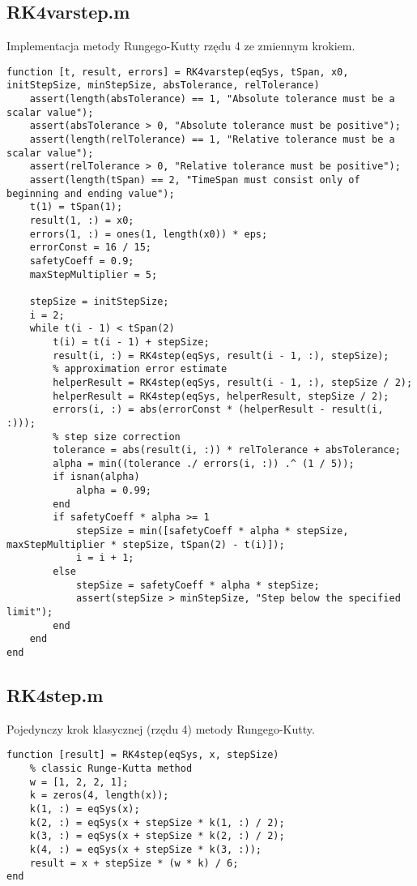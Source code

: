\documentclass[12pt]{article}
\begin{document}
\subsection{RK4varstep.m}
Implementacja metody Rungego-Kutty rzędu 4 ze zmiennym krokiem.
\begin{verbatim}
function [t, result, errors] = RK4varstep(eqSys, tSpan, x0, initStepSize, minStepSize, absTolerance, relTolerance)
    assert(length(absTolerance) == 1, "Absolute tolerance must be a scalar value");
    assert(absTolerance > 0, "Absolute tolerance must be positive");
    assert(length(relTolerance) == 1, "Relative tolerance must be a scalar value");
    assert(relTolerance > 0, "Relative tolerance must be positive");
    assert(length(tSpan) == 2, "TimeSpan must consist only of beginning and ending value");
    t(1) = tSpan(1);
    result(1, :) = x0;
    errors(1, :) = ones(1, length(x0)) * eps;
    errorConst = 16 / 15;
    safetyCoeff = 0.9;
    maxStepMultiplier = 5;

    stepSize = initStepSize;
    i = 2;
    while t(i - 1) < tSpan(2)
        t(i) = t(i - 1) + stepSize;
        result(i, :) = RK4step(eqSys, result(i - 1, :), stepSize);
        % approximation error estimate
        helperResult = RK4step(eqSys, result(i - 1, :), stepSize / 2);
        helperResult = RK4step(eqSys, helperResult, stepSize / 2);
        errors(i, :) = abs(errorConst * (helperResult - result(i, :)));
        % step size correction
        tolerance = abs(result(i, :)) * relTolerance + absTolerance;
        alpha = min((tolerance ./ errors(i, :)) .^ (1 / 5));
        if isnan(alpha)
            alpha = 0.99;
        end
        if safetyCoeff * alpha >= 1
            stepSize = min([safetyCoeff * alpha * stepSize, maxStepMultiplier * stepSize, tSpan(2) - t(i)]);
            i = i + 1;
        else
            stepSize = safetyCoeff * alpha * stepSize;
            assert(stepSize > minStepSize, "Step below the specified limit");
        end
    end
end
\end{verbatim}

\subsection{RK4step.m}
Pojedynczy krok klasycznej (rzędu 4) metody Rungego-Kutty.
\begin{verbatim}
function [result] = RK4step(eqSys, x, stepSize)
    % classic Runge-Kutta method
    w = [1, 2, 2, 1];
    k = zeros(4, length(x));
    k(1, :) = eqSys(x);
    k(2, :) = eqSys(x + stepSize * k(1, :) / 2);
    k(3, :) = eqSys(x + stepSize * k(2, :) / 2);
    k(4, :) = eqSys(x + stepSize * k(3, :));
    result = x + stepSize * (w * k) / 6;
end
\end{verbatim}
\end{document}
